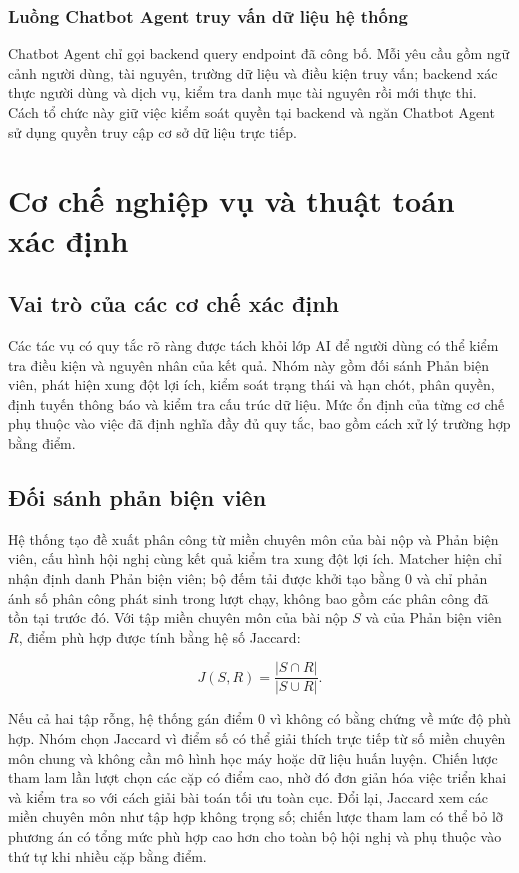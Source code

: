 \subsubsection{Luồng Chatbot Agent truy vấn dữ liệu hệ thống}

Chatbot Agent chỉ gọi backend query endpoint đã công bố. Mỗi yêu cầu gồm ngữ cảnh người dùng, tài nguyên, trường dữ liệu và điều kiện truy vấn; backend xác thực người dùng và dịch vụ, kiểm tra danh mục tài nguyên rồi mới thực thi. Cách tổ chức này giữ việc kiểm soát quyền tại backend và ngăn Chatbot Agent sử dụng quyền truy cập cơ sở dữ liệu trực tiếp.

\section{Cơ chế nghiệp vụ và thuật toán xác định}

\subsection{Vai trò của các cơ chế xác định}

Các tác vụ có quy tắc rõ ràng được tách khỏi lớp AI để người dùng có thể kiểm tra điều kiện và nguyên nhân của kết quả. Nhóm này gồm đối sánh Phản biện viên, phát hiện xung đột lợi ích, kiểm soát trạng thái và hạn chót, phân quyền, định tuyến thông báo và kiểm tra cấu trúc dữ liệu. Mức ổn định của từng cơ chế phụ thuộc vào việc đã định nghĩa đầy đủ quy tắc, bao gồm cách xử lý trường hợp bằng điểm.

\subsection{Đối sánh phản biện viên}
\label{subsec:ch3-matching-cut}

Hệ thống tạo đề xuất phân công từ miền chuyên môn của bài nộp và Phản biện viên, cấu hình hội nghị cùng kết quả kiểm tra xung đột lợi ích. Matcher hiện chỉ nhận định danh Phản biện viên; bộ đếm tải được khởi tạo bằng $0$ và chỉ phản ánh số phân công phát sinh trong lượt chạy, không bao gồm các phân công đã tồn tại trước đó. Với tập miền chuyên môn của bài nộp $S$ và của Phản biện viên $R$, điểm phù hợp được tính bằng hệ số Jaccard:

\[
  J(S,R)=\frac{|S\cap R|}{|S\cup R|}.
\]

Nếu cả hai tập rỗng, hệ thống gán điểm $0$ vì không có bằng chứng về mức độ phù hợp. Nhóm chọn Jaccard vì điểm số có thể giải thích trực tiếp từ số miền chuyên môn chung và không cần mô hình học máy hoặc dữ liệu huấn luyện. Chiến lược tham lam lần lượt chọn các cặp có điểm cao, nhờ đó đơn giản hóa việc triển khai và kiểm tra so với cách giải bài toán tối ưu toàn cục. Đổi lại, Jaccard xem các miền chuyên môn như tập hợp không trọng số; chiến lược tham lam có thể bỏ lỡ phương án có tổng mức phù hợp cao hơn cho toàn bộ hội nghị và phụ thuộc vào thứ tự khi nhiều cặp bằng điểm.

